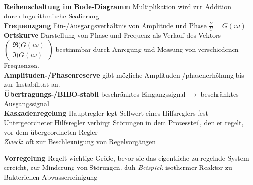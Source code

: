 \documentclass{article}
\begin{document}
\begin{multicols}{6}
\\
\textbf{Reihenschaltung im Bode-Diagramm} Multiplikation wird zur Addition durch logarithmische Scalierung
\\
\textbf{Frequenzgang} Ein-/Ausgangsverhältnis von Amplitude und Phase $\displaystyle \frac{Y}{U} = G(i\omega)$ 
\\
\textbf{Ortskurve} Darstellung von Phase und Frequenz als Verlauf des Vektors $\left(\begin{array}{c} \Re(G(i\omega) \\ \Im(G(i\omega) \end{array}\right)$ bestimmbar durch Anregung und Messung von verschiedenen Frequenzen.
\\
\textbf{Amplituden-/Phasenreserve} gibt mögliche Amplituden-/phasenerhöhung bis zur Instabilität an.
\\
\textbf{Übertragungs-/BIBO-stabil} beschränktes Eingangssignal $\rightarrow$ beschränktes Ausgangssignal
\\
\textbf{Kaskadenregelung} Hauptregler legt Sollwert eines Hilfsreglers fest \\
Untergeordneter Hilfsregler verbirgt Störungen in dem Prozessteil, den er regelt, vor dem übergeordneten Regler \\
	\textit{Zweck}: oft zur Beschleunigung von Regelvorgängen
\begin{figure}[H]
\end{figure}
\textbf{Vorregelung} Regelt wichtige Größe, bevor sie das eigentliche zu regelnde System erreicht, zur Minderung von Störungen. duh
\textit{Beispiel:} isothermer Reaktor zu Bakteriellen Abwasserreinigung

\end{multicols}
\end{document}
